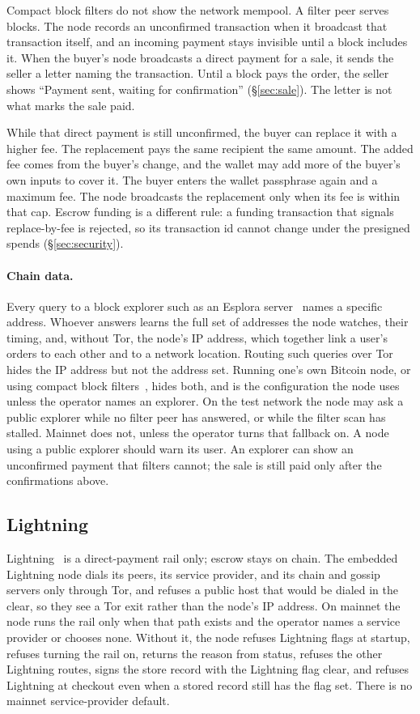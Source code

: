 Compact block filters do not show the network mempool. A filter peer serves blocks. The node records an unconfirmed transaction when it broadcast that transaction itself, and an incoming payment stays invisible until a block includes it. When the buyer's node broadcasts a direct payment for a sale, it sends the seller a letter naming the transaction. Until a block pays the order, the seller shows ``Payment sent, waiting for confirmation'' (\S\ref{sec:sale}). The letter is not what marks the sale paid.

While that direct payment is still unconfirmed, the buyer can replace it with a higher fee. The replacement pays the same recipient the same amount. The added fee comes from the buyer's change, and the wallet may add more of the buyer's own inputs to cover it. The buyer enters the wallet passphrase again and a maximum fee. The node broadcasts the replacement only when its fee is within that cap. Escrow funding is a different rule: a funding transaction that signals replace-by-fee is rejected, so its transaction id cannot change under the presigned spends (\S\ref{sec:security}).

\paragraph{Chain data.} Every query to a block explorer such as an Esplora server~\citep{esplora} names a specific address. Whoever answers learns the full set of addresses the node watches, their timing, and, without Tor, the node's IP address, which together link a user's orders to each other and to a network location. Routing such queries over Tor hides the IP address but not the address set. Running one's own Bitcoin node, or using compact block filters~\citep{bip157,bip158}, hides both, and is the configuration the node uses unless the operator names an explorer. On the test network the node may ask a public explorer while no filter peer has answered, or while the filter scan has stalled. Mainnet does not, unless the operator turns that fallback on. A node using a public explorer should warn its user. An explorer can show an unconfirmed payment that filters cannot; the sale is still paid only after the confirmations above.

\subsection{Lightning}

Lightning~\citep{poon2016} is a direct-payment rail only; escrow stays on chain. The embedded Lightning node dials its peers, its service provider, and its chain and gossip servers only through Tor, and refuses a public host that would be dialed in the clear, so they see a Tor exit rather than the node's IP address. On mainnet the node runs the rail only when that path exists and the operator names a service provider or chooses none. Without it, the node refuses Lightning flags at startup, refuses turning the rail on, returns the reason from status, refuses the other Lightning routes, signs the store record with the Lightning flag clear, and refuses Lightning at checkout even when a stored record still has the flag set. There is no mainnet service-provider default.

